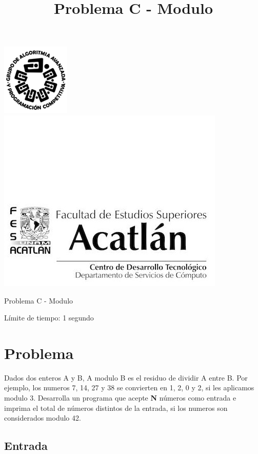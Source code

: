 \documentclass[letter,10pt]{article}
\date{}
\begin{document}
\title{Problema C - Modulo}

\includegraphics[scale=0.6]{logo} \hspace*{9.00cm}
\includegraphics[scale=0.5]{dsc} 
\bigskip
\begin{center}
    \Large Problema C - Modulo
\end{center}

\begin{flushright}
Límite de tiempo: 1 segundo
\par\end{flushright}
\bigskip

\section*{Problema}

Dados dos enteros A y B, A modulo B es el residuo de dividir A entre B. Por ejemplo, los numeros 7, 14, 27 y 38 se convierten en 1, 2, 0 y 2, si les aplicamos modulo 3. Desarrolla un programa que acepte \textbf{N} números como entrada e imprima el total de números distintos de la entrada, si los numeros son considerados modulo 42.

\subsection*{Entrada}
\end{document}
